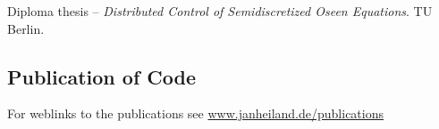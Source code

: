 \documentclass[11pt, a4paper]{article} %
\newcommand{\years}[1]{\marginnote{\scriptsize #1}} %
\begin{document}
\years{2009} Diploma thesis -- \emph{Distributed Control of Semidiscretized Oseen Equations}. TU Berlin.

\vspace{.1in}
\subsection*{Publication of Code}


\vfill
For weblinks to the publications see \href{http://www.janheiland.de/publications}{www.janheiland.de/publications}



% 
% 
% 
\end{document}
